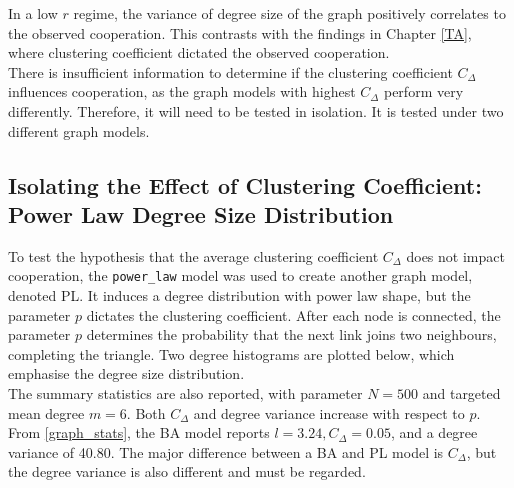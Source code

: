 In a low $r$ regime, the variance of degree size of the graph positively correlates to the observed cooperation. This contrasts with the findings in Chapter \ref{TA}, where clustering coefficient dictated the observed cooperation. \\

There is insufficient information to determine if the clustering coefficient $C_\Delta$ influences cooperation, as the graph models with highest $C_\Delta$ perform very differently. Therefore, it will need to be tested in isolation. It is tested under two different graph models. \\

\subsection{Isolating the Effect of Clustering Coefficient: Power Law Degree Size Distribution}
To test the hypothesis that the average clustering coefficient $C_\Delta$ does not impact cooperation, the \verb+power_law+ model was used to create another graph model, denoted PL. It induces a degree distribution with power law shape, but the parameter $p$ dictates the clustering coefficient. After each node is connected, the parameter $p$ determines the probability that the next link joins two neighbours, completing the triangle. Two degree histograms are plotted below, which emphasise the degree size distribution. \\
\FloatBarrier
{}
\FloatBarrier
{}
\FloatBarrier
The summary statistics are also reported, with parameter $N = 500$ and targeted mean degree $m=6$. Both $C_\Delta$ and degree variance increase with respect to $p$. From \ref{graph_stats}, the BA model reports $l=3.24, C_\Delta = 0.05$, and a degree variance of 40.80. The major difference between a BA and PL model is $C_\Delta$, but the degree variance is also different and must be regarded.   \\
\FloatBarrier
